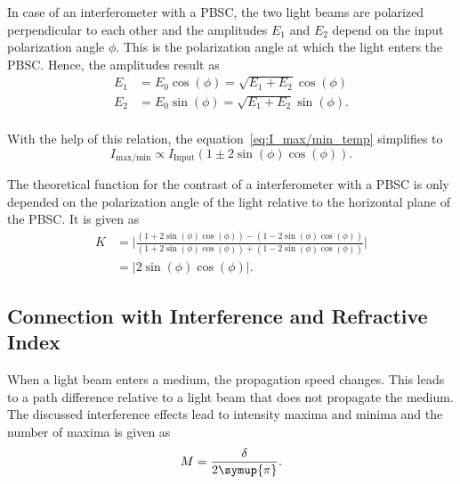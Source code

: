 In case of an interferometer with a PBSC, the two light beams are polarized perpendicular to each other and the amplitudes $E_1$ and $E_2$ depend on the input polarization angle $\phi$. This
is the polarization angle at which the light enters the PBSC.
Hence, the amplitudes result as
\begin{align*}
    E_1 &= E_0\cos(\phi) = \sqrt{E_1+E_2}\cos(\phi) \\
    E_2 &= E_0\sin(\phi) = \sqrt{E_1+E_2}\sin(\phi). \\
\end{align*}

With the help of this relation, the equation~\eqref{eq:I_max/min_temp} simplifies to
\begin{equation}
    I_{\text{max/min}} \propto I_{\text{Input}}(1 \pm 2\sin(\phi)\cos(\phi)).
    \label{eq:I_max/min}
\end{equation}

The theoretical function for the contrast of a interferometer with a PBSC is only depended on the polarization angle of the light relative to the horizontal plane of
the PBSC. It is given as
\begin{align}
    K &= \bigg|\frac{(1 + 2\sin(\phi)\cos(\phi)) - (1 - 2\sin(\phi)\cos(\phi))}{(1 + 2\sin(\phi)\cos(\phi)) + (1 - 2\sin(\phi)\cos(\phi))}\bigg| \\
      &= |2\sin(\phi)\cos(\phi)|.
      \label{eq:contrast_theo_func}
\end{align}

\subsection{Connection with Interference and Refractive Index}
\label{sec:Connection_Interference_n}
When a light beam enters a medium, the propagation speed changes. This leads to a path difference relative to a light beam that does not propagate the medium.
The discussed interference effects lead to intensity maxima and minima and the number of maxima is given as
\begin{equation}
    M = \frac{\delta}{2\symup{\pi}}.
    \label{eq:M}
\end{equation}

